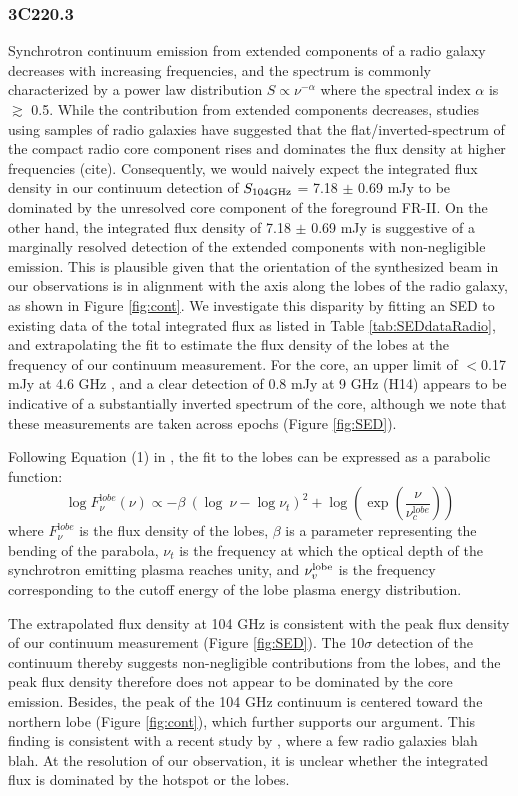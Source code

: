 \documentclass[twocolumn,apj,numberedappendix]{emulateapj}
\begin{document}
\subsubsection{3C220.3}
Synchrotron continuum emission from extended components of a radio galaxy decreases with increasing frequencies, and the spectrum is commonly characterized by a power law distribution $S \propto \nu^{-\alpha}$ where the spectral index $\alpha$ is $\gtrsim$ 0.5. While the contribution from extended components decreases, studies using samples of radio galaxies have suggested that the flat/inverted-spectrum of the compact radio core component rises and dominates the flux density at higher frequencies (cite). Consequently, we would naively expect the integrated flux density in our continuum detection of $S_{\rm 104GHz}$ = 7.18 $\pm$ 0.69 mJy to be dominated by the unresolved core component of the foreground FR-II. On the other hand, the integrated flux density of 7.18 $\pm$ 0.69 mJy is suggestive of a marginally resolved detection of the extended components with non-negligible emission. This is plausible given that the orientation of the synthesized beam in our observations is in alignment with the axis along the 
lobes of the radio galaxy, as shown in Figure \ref{fig:cont}. We investigate this disparity by fitting an SED to existing data of the total integrated flux as listed in Table \ref{tab:SEDdataRadio}, and extrapolating the fit to estimate the flux density of the lobes at the frequency of our continuum measurement. For the core, an upper limit of $<$0.17 mJy at 4.6 GHz \citep{Mullin06a}, and a clear detection of 0.8 mJy at 9 GHz (H14) appears to be indicative of a substantially inverted spectrum of the core, although we note that these measurements are taken across epochs (Figure \ref{fig:SED}).

Following Equation (1) in \citet{Cleary07a}, the fit to the lobes can be expressed as a parabolic function:
\begin{equation}
\log F_{\nu}^{\mathrm lobe} (\nu) \propto - \beta\ (\log\ \nu - \log \nu_{t})^2  + \log (\exp({\frac{\nu}{\nu_c^{\mathrm lobe}}}))
\end{equation}
where $F_{\nu}^{\mathrm lobe}$ is the flux density of the lobes, $\beta$ is a parameter representing the bending of the parabola, $\nu_t$ is the frequency at which the optical depth of the synchrotron emitting plasma reaches unity, and $\nu_v^{\rm lobe}$ is the frequency corresponding to the cutoff energy of the lobe plasma energy distribution. 

The extrapolated flux density at 104 GHz is consistent with the peak flux density of our continuum measurement (Figure \ref{fig:SED}). The 10$\sigma$ detection of the continuum thereby suggests
non-negligible contributions from the lobes, and the peak flux density therefore does not appear to be dominated by the core 
emission. Besides, the peak of the 104 GHz continuum is
centered toward the northern lobe (Figure \ref{fig:cont}), which further supports our argument. This finding is consistent with a recent study by \citet{Hardcastle08a}, where a few radio galaxies blah blah. At the resolution of our observation, it is unclear whether the integrated flux is dominated by the hotspot or the lobes. 
\end{document}
